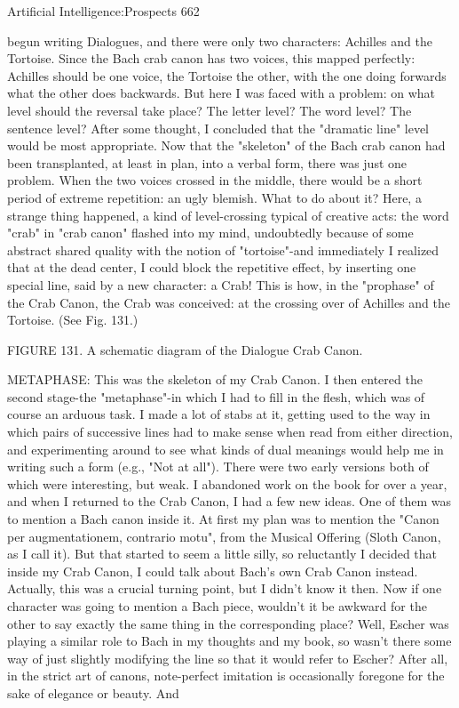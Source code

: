 Artificial Intelligence:Prospects                                                         662

begun writing Dialogues, and there were only two characters: Achilles and the Tortoise.
Since the Bach crab canon has two voices, this mapped perfectly: Achilles should be one
voice, the Tortoise the other, with the one doing forwards what the other does backwards.
But here I was faced with a problem: on what level should the reversal take place? The
letter level? The word level? The sentence level? After some thought, I concluded that
the "dramatic line" level would be most appropriate.
         Now that the "skeleton" of the Bach crab canon had been transplanted, at least in
plan, into a verbal form, there was just one problem. When the two voices crossed in the
middle, there would be a short period of extreme repetition: an ugly blemish. What to do
about it? Here, a strange thing happened, a kind of level-crossing typical of creative acts:
the word "crab" in "crab canon" flashed into my mind, undoubtedly because of some
abstract shared quality with the notion of "tortoise"-and immediately I realized that at the
dead center, I could block the repetitive effect, by inserting one special line, said by a
new character: a Crab! This is how, in the "prophase" of the Crab Canon, the Crab was
conceived: at the crossing over of Achilles and the Tortoise. (See Fig. 131.)




FIGURE 131. A schematic diagram of the Dialogue Crab Canon.

         METAPHASE: This was the skeleton of my Crab Canon. I then entered the
second stage-the "metaphase"-in which I had to fill in the flesh, which was of course an
arduous task. I made a lot of stabs at it, getting used to the way in which pairs of
successive lines had to make sense when read from either direction, and experimenting
around to see what kinds of dual meanings would help me in writing such a form (e.g.,
"Not at all"). There were two early versions both of which were interesting, but weak. I
abandoned work on the book for over a year, and when I returned to the Crab Canon, I
had a few new ideas. One of them was to mention a Bach canon inside it. At first my plan
was to mention the "Canon per augmentationem, contrario motu", from the Musical
Offering (Sloth Canon, as I call it). But that started to seem a little silly, so reluctantly I
decided that inside my Crab Canon, I could talk about Bach's own Crab Canon instead.
Actually, this was a crucial turning point, but I didn't know it then.
         Now if one character was going to mention a Bach piece, wouldn't it be awkward
for the other to say exactly the same thing in the corresponding place? Well, Escher was
playing a similar role to Bach in my thoughts and my book, so wasn't there some way of
just slightly modifying the line so that it would refer to Escher? After all, in the strict art
of canons, note-perfect imitation is occasionally foregone for the sake of elegance or
beauty. And




